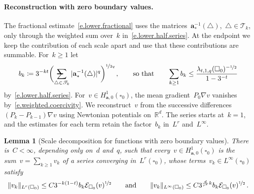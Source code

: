 \documentclass[11pt,letterpaper]{article}
\makeatletter
\numberwithin{equation}{section}
\newtheorem{lemma}[theorem]{Lemma}
\theoremstyle{definition}
\newcommand{\Rd}{\mathbb{R}^d}
\renewcommand{\a}{\mathbf{a}}
\newcommand{\nf}{\nicefrac}
\newcommand{\cu}{\square}
\DeclarePairedDelimiter{\norm}{\lVert}{\rVert}
\newcommand{\Ener}{\mathcal E}
\newcommand{\Hzero}[1]{H^1_{#1,0}}
\newcommand{\avsum}{\mathop{\mathpalette\avsuminner\relax}\displaylimits}
\newcommand\avsuminner[2]{%
	{\sbox0{$\m@th#1\sum$}%
		\vphantom{\usebox0}%
		\ooalign{%
			\hidewidth
			\smash{\,\rule[.23em]{8.8pt}{1.1pt} \relax}%
			\hidewidth\cr
			$\m@th#1\sum$\cr
		}%
	}%
}
\makeatother
\begin{document}
\paragraph{Reconstruction with zero boundary values.} The fractional estimate~\eqref{e.lower.fractional} uses the matrices~$\a_*^{-1}(\triangle)$,~$\triangle\in\mathscr T_k$, only through the weighted sum over~$k$ in~\eqref{e.lower.half.series}. At the endpoint we keep the contribution of each scale apart and use that these contributions are summable. For~$k\geq1$ let
\begin{equation}
	b_k\coloneqq3^{-kt}\biggl(\avsum_{\triangle\in\mathscr T_k}|\a_*^{-1}(\triangle)|^q\biggr)^{\nf1{2q}}\,,\qquad\mbox{so that}\qquad\sum_{k\geq1}b_k\leq\frac{\lambda_{t,1,q}(\cu_0)^{-\nf12}}{1-3^{-t}}
	\label{e.endpoint.scales}
\end{equation}
by~\eqref{e.lower.half.series}. For~$v\in\Hzero{\a}(\cu_0)$, the mean gradient~$P_0\nabla v$ vanishes by~\eqref{e.weighted.coercivity}. We reconstruct~$v$ from the successive differences~$(P_k-P_{k-1})\nabla v$ using Newtonian potentials on~$\Rd$. The series starts at~$k=1$, and the estimates for each term retain the factor~$b_k$ in~$L^r$ and~$L^\infty$.

\begin{lemma}[Scale decomposition for functions with zero boundary values]
\label{l.dirichlet.reconstruction}
There is~$C<\infty$, depending only on~$d$ and~$q$, such that every~$v\in\Hzero{\a}(\cu_0)$ is the sum~$v=\sum_{k\geq1}v_k$ of a series converging in~$L^r(\cu_0)$, whose terms~$v_k\in L^\infty(\cu_0)$ satisfy
\begin{equation}
	\norm{v_k}_{L^r(\cu_0)}\leq C3^{-k(1-t)}b_k\Ener_{\cu_0}(v)^{\nf12}\qquad\mbox{and}\qquad\norm{v_k}_{L^\infty(\cu_0)}\leq C3^{\frac d{r^*}k}b_k\Ener_{\cu_0}(v)^{\nf12}\,.
	\label{e.dirichlet.blocks}
\end{equation}
\end{lemma}
\end{document}
